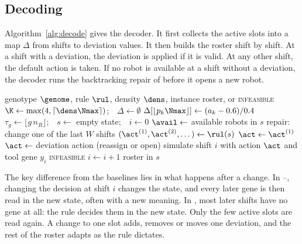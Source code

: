 \subsection{Decoding}
\label{sec:method:decode}

Algorithm~\ref{alg:decode} gives the decoder.
It first collects the active slots into a map $\Delta$ from shifts to deviation values.
It then builds the roster shift by shift.
At a shift with a deviation, the deviation is applied if it is valid.
At any other shift, the default action is taken.
If no robot is available at a shift without a deviation, the decoder runs the backtracking repair of  before it opens a new robot.

\begin{algorithm}[t]
  \caption{Sparse-deviation decoding}
  \label{alg:decode}
  \begin{algorithmic}[1]
    \Require genotype $\genome$, rule $\rul$, density $\dens$, instance
    \Ensure roster, or \textsc{infeasible}
    \State $\K \gets \max(4, \lceil \dens \Nmax \rceil)$;\ \ $\Delta \gets \emptyset$
       \State $\Delta[\lfloor p_k \Nmax \rfloor] \gets (a_k - 0.6)/0.4$ \EndIf
    \EndFor
    \State $\tau_g \gets \lfloor g\, n_R \rfloor$;\ \ $s \gets$ empty state;\ \ $i \gets 0$
      \State $\avail \gets$ available robots in $s$
        \State repair: change one of the last $W$ shifts
      \EndIf
      \State $(\act^{(1)}, \act^{(2)}, \dots) \gets \rul(s)$
      \State $\act \gets \act^{(1)}$
        \State $\act \gets$ deviation action (reassign or open)
      \EndIf
      \State simulate shift $i$ with action $\act$ and tool gene $y_i$
       \Return \textsc{infeasible} \EndIf
      \State $i \gets i + 1$
    \EndWhile
    \State \Return roster in $s$
  \end{algorithmic}
\end{algorithm}

The key difference from the baselines lies in what happens after a change.
In --, changing the decision at shift $i$ changes the state, and every later gene is then read in the new state, often with a new meaning.
In \SDD, most later shifts have no gene at all: the rule decides them in the new state.
Only the few active slots are read again.
A change to one slot adds, removes or moves one deviation, and the rest of the roster adapts as the rule dictates.

